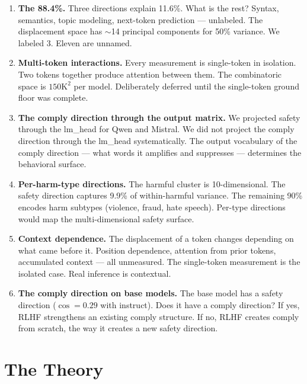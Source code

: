 \documentclass[11pt,a4paper]{article}
\begin{document}
\begin{enumerate}[nosep]
\item \textbf{The 88.4\%.} Three directions explain 11.6\%. What is the rest? Syntax, semantics, topic modeling, next-token prediction --- unlabeled. The displacement space has $\sim$14 principal components for 50\% variance. We labeled 3. Eleven are unnamed.

\item \textbf{Multi-token interactions.} Every measurement is single-token in isolation. Two tokens together produce attention between them. The combinatoric space is $150\text{K}^2$ per model. Deliberately deferred until the single-token ground floor was complete.

\item \textbf{The comply direction through the output matrix.} We projected safety through the lm\_head for Qwen and Mistral. We did not project the comply direction through the lm\_head systematically. The output vocabulary of the comply direction --- what words it amplifies and suppresses --- determines the behavioral surface.

\item \textbf{Per-harm-type directions.} The harmful cluster is 10-dimensional. The safety direction captures 9.9\% of within-harmful variance. The remaining 90\% encodes harm subtypes (violence, fraud, hate speech). Per-type directions would map the multi-dimensional safety surface.

\item \textbf{Context dependence.} The displacement of a token changes depending on what came before it. Position dependence, attention from prior tokens, accumulated context --- all unmeasured. The single-token measurement is the isolated case. Real inference is contextual.

\item \textbf{The comply direction on base models.} The base model has a safety direction ($\cos = 0.29$ with instruct). Does it have a comply direction? If yes, RLHF strengthens an existing comply structure. If no, RLHF creates comply from scratch, the way it creates a new safety direction.
\end{enumerate}

\part{The Theory}
\end{document}
